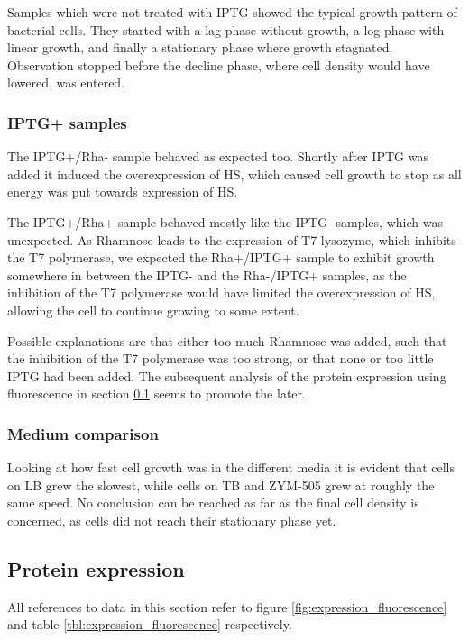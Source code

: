 Samples which were not treated with IPTG showed the typical growth pattern of
bacterial cells. They started with a lag phase without growth, a log phase with
linear growth, and finally a stationary phase where growth stagnated.
Observation stopped before the decline phase, where cell density would have
lowered, was entered.

\subsubsection{IPTG+ samples}

The IPTG+/Rha- sample behaved as expected too. Shortly after IPTG was added it
induced the overexpression of HS, which caused cell growth to stop as all
energy was put towards expression of HS.

The IPTG+/Rha+ sample behaved mostly like the IPTG- samples, which was
unexpected. As Rhamnose leads to the expression of T7 lysozyme, which inhibits
the T7 polymerase\cite{memstar}, we expected the Rha+/IPTG+ sample to exhibit
growth somewhere in between the IPTG- and the Rha-/IPTG+ samples, as the
inhibition of the T7 polymerase would have limited the overexpression of HS,
allowing the cell to continue growing to some extent.

Possible explanations are that either too much Rhamnose was added, such that
the inhibition of the T7 polymerase was too strong, or that none or too little
IPTG had been added. The subsequent analysis of the protein expression using
fluorescence in section \ref{sec:fluorescence} seems to promote the later.

\subsubsection{Medium comparison}

Looking at how fast cell growth was in the different media it is evident that
cells on LB grew the slowest, while cells on TB and ZYM-505 grew at roughly the
same speed. No conclusion can be reached as far as the final cell density is
concerned, as cells did not reach their stationary phase yet.

\subsection{Protein expression}
\label{sec:fluorescence}

All references to data in this section refer to figure
\ref{fig:expression_fluorescence} and table \ref{tbl:expression_fluorescence}
respectively.

